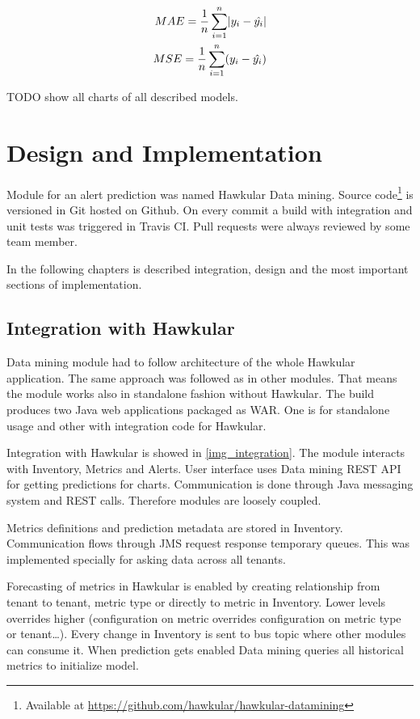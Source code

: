     \begin{eqnarray} \label{adf-test}
         MAE = \frac{1}{n} \sum_{i=1}^{n} \abs{y_i - \hat{y_i}} \\
         MSE = \frac{1}{n} \sum_{i=1}^{n}(y_i - \hat{y_i})
    \end{eqnarray}


    TODO show all charts of all described models. 

\chapter{Design and Implementation}
Module for an alert prediction was named Hawkular Data mining. Source
code\footnote{Available at \url{https://github.com/hawkular/hawkular-datamining}} is versioned in Git
hosted on Github. On every commit a build with integration and unit tests was triggered in
Travis CI. Pull requests were always reviewed by some team member.

In the following chapters is described integration, design and the most important
sections of implementation.

    \section{Integration with Hawkular}  
    Data mining module had to follow architecture of the whole Hawkular application.
    The same approach was followed as in other modules. That means the module 
    works also in standalone fashion without Hawkular. The build produces two Java
    web applications packaged as WAR. One is for standalone usage and other with
    integration code for Hawkular.

    Integration with Hawkular is showed in \ref{img_integration}.
    The module interacts with Inventory, Metrics and Alerts. User interface uses Data
    mining REST API for getting predictions for charts. Communication is done through 
    Java messaging system and REST calls. Therefore modules are
    loosely coupled.

    Metrics definitions and prediction metadata are stored in Inventory.
    Communication flows through JMS request response temporary queues. This was
    implemented specially for asking data across all tenants.

    Forecasting of 
    metrics in Hawkular is enabled by creating relationship from tenant to tenant, metric type
    or directly to metric in Inventory. Lower levels overrides higher (configuration on metric overrides
    configuration on metric type or tenant\dots). Every change in Inventory is sent to bus topic
    where other modules can consume it. When prediction gets enabled Data mining queries all
    historical metrics to initialize model.

